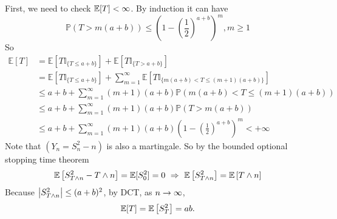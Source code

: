\begin{exam}
    First, we need to check $\mathbb{E}[T] < \infty$. By induction it can have
    \begin{equation*}
        \mathbb{P}(T>m(a+b)) \leqslant\left(1-\left(\frac{1}{2}\right)^{a+b}\right)^m, m \geqslant 1
    \end{equation*}
    So
    \begin{equation*}
        \begin{aligned}
            \mathbb{E}[T] & =\mathbb{E}\left[T \mathbb{I}_{\{T \leqslant a+b\}}\right]+\mathbb{E}\left[T \mathbb{I}_{\{T>a+b\}}\right] \\
            & =\mathbb{E}\left[T \mathbb{I}_{\{T \leqslant a+b\}}\right]+\sum_{m=1}^{\infty} \mathbb{E}\left[T \mathbb{I}_{\{m(a+b)<T \leqslant(m+1)(a+b)\}}\right] \\
            & \leqslant a+b+\sum_{m=1}^{\infty}(m+1)(a+b) \mathbb{P}(m(a+b)<T \leqslant(m+1)(a+b)) \\
            & \leqslant a+b+\sum_{m=1}^{\infty}(m+1)(a+b) \mathbb{P}(T>m(a+b)) \\
            & \leqslant a+b+\sum_{m=1}^{\infty}(m+1)(a+b)\left(1-\left(\frac{1}{2}\right)^{a+b}\right)^m<+\infty
        \end{aligned}
    \end{equation*}
    Note that $(Y_n = S_n^2 - n)$ is also a martingale. So by the bounded optional stopping time theorem
    \begin{equation*}
        \mathbb{E}\left[S^2_{T \wedge n} - T \wedge n\right] = \mathbb{E}[S^2_0] = 0 ~\Rightarrow~\mathbb{E}\left[S^2_{T \wedge n}\right] = \mathbb{E}\left[T \wedge n\right]
    \end{equation*}
    Because $\left\lvert S^2_{T \wedge n}\right\lvert \leq (a+b)^2$, by DCT, as $n \rightarrow \infty$,
    \begin{equation*}
        \mathbb{E}[T] = \mathbb{E}\left[S^2_T\right] = ab.
    \end{equation*}
\end{exam}

